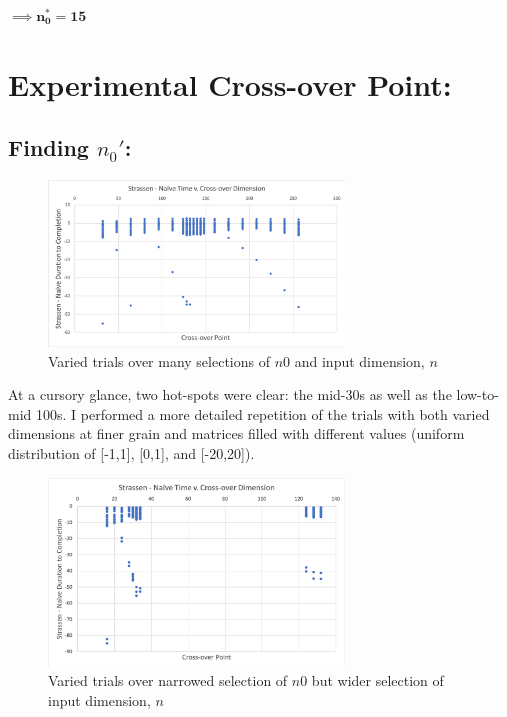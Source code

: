 \documentclass[conference]{styles/acmsiggraph}
\newcommand{\?}{\stackrel{?}{=}}
\begin{document}
$\implies \mathbf{n_0^* = 15}$
\section{Experimental Cross-over Point:} \label{section:PART2}
\subsection{Finding $n_0'$:} \label{section:BIGDATA}

\begin{figure}[h!]
    \centering
    \includegraphics[width=0.7\textwidth]{Figures/broadSearch.png}
    \caption{Varied trials over many selections of $n0$ and input dimension, $n$}
    \label{fig:Cursory Glance}
\end{figure}
\FloatBarrier %

At a cursory glance, two hot-spots were clear: the mid-30s as well as the low-to-mid 100s.  I performed a more detailed repetition of the trials with both varied dimensions at finer grain and matrices filled with different values (uniform distribution of [-1,1], [0,1], and [-20,20]).\\

\begin{figure}[h!]
    \centering
    \includegraphics[width=0.7\textwidth]{Figures/Optimal.png}
    \caption{Varied trials over narrowed selection of $n0$ but wider selection of input dimension, $n$}
    \label{fig:Narrowed Search Glance}
\end{figure}
\FloatBarrier %
\end{document}
